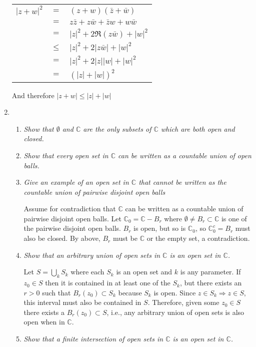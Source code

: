 \documentclass[11pt]{article}
\begin{document}
\begin{enumerate}
\begin{tabular}{lll}
$|z+w|^2$ 	&$=$&		$(z+w)(\bar{z}+\bar{w})$\\
	 	&$=$& 		$z\bar{z}+z\bar{w}+\bar{z}w+w\bar{w}$\\
		&$=$&		$|z|^2+2\Re(z\bar{w})+|w|^2$\\
		&$\leq$&	$|z|^2+2|z\bar{w}|+|w|^2$\\
		&$=$&		$|z|^2+2|z||w|+|w|^2$\\
		&$=$&		$(|z| + |w|)^2$
\end{tabular}

And therefore $|z+w| \leq |z| + |w|$

\item
\begin{enumerate}
\item \emph{Show that $\emptyset$ and $\mathbb{C}$ are the only subsets of $\mathbb{C}$ which are both open and closed.}
\item \emph{Show that every open set in $\mathbb{C}$ can be written as a countable union of open balls.}


\item \emph{Give an example of an open set in $\mathbb{C}$ that cannot be written as the countable union of pairwise disjoint open balls}

Assume for contradiction that $\mathbb{C}$ can be written as a countable union of pairwise disjoint open balls.  Let $\mathbb{C}_0 = \mathbb{C}-B_r$ where $\emptyset \neq B_r \subset \mathbb{C}$ is one of the pairwise disjoint open balls.  $B_r$ is open, but so is $\mathbb{C}_0$, so $\mathbb{C}_0^c = B_r$ must also be closed.  By above, $B_r$ must be $\mathbb{C}$ or the empty set, a contradiction.

\item \emph{Show that an arbitrary union of open sets in $\mathbb{C}$ is an open set in $\mathbb{C}$.}

Let $S = \bigcup_{k}S_k$ where each $S_k$ is an open set and $k$ is any parameter.  If $z_0 \in S$ then it is contained in at least one of the $S_k$, but there exists an $r > 0$ such that $B_r(z_0) \subset S_k$ because $S_k$ is open.  Since $z \in S_k \Rightarrow z \in S$, this interval must also be contained in $S$. Therefore, given some $z_0 \in S$ there exists a $B_r(z_0) \subset S$, i.e., any arbitrary union of open sets is also open when in $\mathbb{C}$.

\item \emph{Show that a finite intersection of open sets in $\mathbb{C}$ is an open set in $\mathbb{C}$.}


\end{enumerate}
\end{enumerate}
\end{document}
